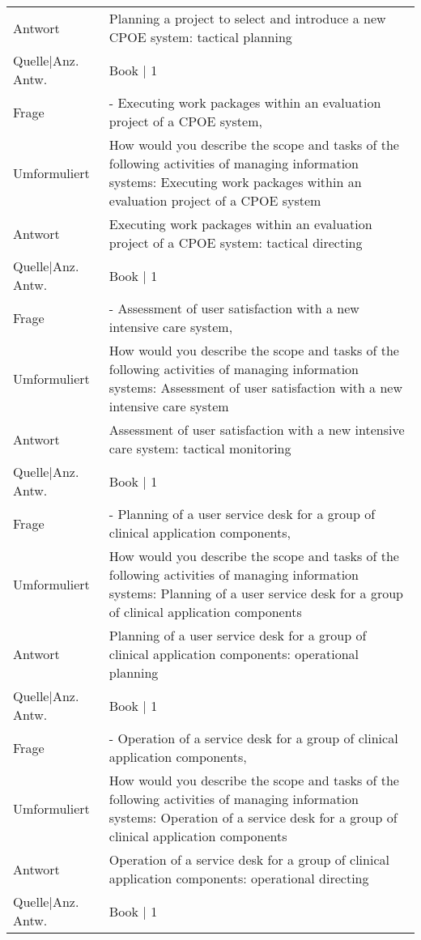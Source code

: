 {\begin{landscape}
\begin{longtable}{p{3cm}p{}}
    Antwort & Planning a project to select and introduce a new CPOE system: tactical planning \\
    Quelle|Anz. Antw. & Book | 1 \\
    \midrule
    Frage & - Executing work packages within an evaluation project of a CPOE system, \\
    Umformuliert & How would you describe the scope and tasks of the following activities of managing information systems: Executing work packages within an evaluation project of a CPOE system \\
    Antwort & Executing work packages within an evaluation project of a CPOE system: tactical directing \\
    Quelle|Anz. Antw. & Book | 1 \\
    \midrule
    Frage & - Assessment of user satisfaction with a new intensive care system, \\
    Umformuliert & How would you describe the scope and tasks of the following activities of managing information systems: Assessment of user satisfaction with a new intensive care system \\
    Antwort & Assessment of user satisfaction with a new intensive care system: tactical monitoring \\
    Quelle|Anz. Antw. & Book | 1 \\
    \midrule
    Frage & - Planning of a user service desk for a group of clinical application components, \\
    Umformuliert & How would you describe the scope and tasks of the following activities of managing information systems: Planning of a user service desk for a group of clinical application components \\
    Antwort & Planning of a user service desk for a group of clinical application components: operational planning \\
    Quelle|Anz. Antw. & Book | 1 \\
    \midrule
    Frage & - Operation of a service desk for a group of clinical application components, \\
    Umformuliert & How would you describe the scope and tasks of the following activities of managing information systems: Operation of a service desk for a group of clinical application components \\
    Antwort & Operation of a service desk for a group of clinical application components: operational directing \\
    Quelle|Anz. Antw. & Book | 1 \\

\end{longtable}
\end{landscape}}
